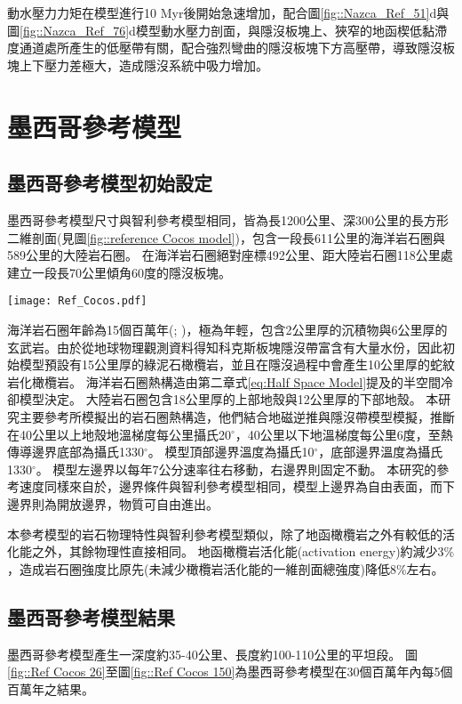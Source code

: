動水壓力力矩在模型進行10 Myr後開始急速增加，配合圖\ref{fig::Nazca_Ref_51}d與圖\ref{fig::Nazca_Ref_76}d模型動水壓力剖面，與隱沒板塊上、狹窄的地函楔低黏滯度通道處所產生的低壓帶有關，配合強烈彎曲的隱沒板塊下方高壓帶，導致隱沒板塊上下壓力差極大，造成隱沒系統中吸力增加。

\newpage
\section{墨西哥參考模型}
\subsection{墨西哥參考模型初始設定}
墨西哥參考模型尺寸與智利參考模型相同，皆為長1200公里、深300公里的長方形二維剖面(見圖\ref{fig::reference Cocos model})，包含一段長611公里的海洋岩石圈與589公里的大陸岩石圈。
在海洋岩石圈絕對座標492公里、距大陸岩石圈118公里處建立一段長70公里傾角60度的隱沒板塊。
\begin{figure*}[ht!]
    \centering
    \texttt{[image: Ref\_Cocos.pdf]}
    \caption[墨西哥參考模型設計與邊界條件示意圖]{墨西哥參考模型設計與邊界條件示意圖}
    \label{fig::reference Cocos model}
\end{figure*}

海洋岩石圈年齡為15個百萬年(\citealp{Manea2011Thermal}; \citealp{muller2019})，極為年輕，包含2公里厚的沉積物與6公里厚的玄武岩。由於從地球物理觀測資料得知科克斯板塊隱沒帶富含有大量水份，因此初始模型預設有15公里厚的綠泥石橄欖岩，並且在隱沒過程中會產生10公里厚的蛇紋岩化橄欖岩。
海洋岩石圈熱構造由第二章式\ref{eq:Half Space Model}提及的半空間冷卻模型決定。
大陸岩石圈包含18公里厚的上部地殼與12公里厚的下部地殼。
本研究主要參考\citealp{Manea2011Curie}所模擬出的岩石圈熱構造，他們結合地磁逆推與隱沒帶模型模擬，推斷在40公里以上地殼地溫梯度每公里攝氏20$^{\circ}$，40公里以下地溫梯度每公里6度，至熱傳導邊界底部為攝氏1330$^{\circ}$。
模型頂部邊界溫度為攝氏10$^{\circ}$，底部邊界溫度為攝氏1330$^{\circ}$。
模型左邊界以每年7公分速率往右移動，右邊界則固定不動。
本研究的參考速度同樣來自於\citealp{o2005uncertainties}，邊界條件與智利參考模型相同，模型上邊界為自由表面，而下邊界則為開放邊界，物質可自由進出。

本參考模型的岩石物理特性與智利參考模型類似，除了地函橄欖岩之外有較低的活化能之外，其餘物理性直接相同。
地函橄欖岩活化能(activation energy)約減少3$\%$，造成岩石圈強度比原先(未減少橄欖岩活化能的一維剖面總強度)降低8$\%$左右。


\subsection{墨西哥參考模型結果}\label{墨西哥參考模型結果}
墨西哥參考模型產生一深度約35-40公里、長度約100-110公里的平坦段。
圖\ref{fig::Ref Cocos 26}至圖\ref{fig::Ref Cocos 150}為墨西哥參考模型在30個百萬年內每5個百萬年之結果。

